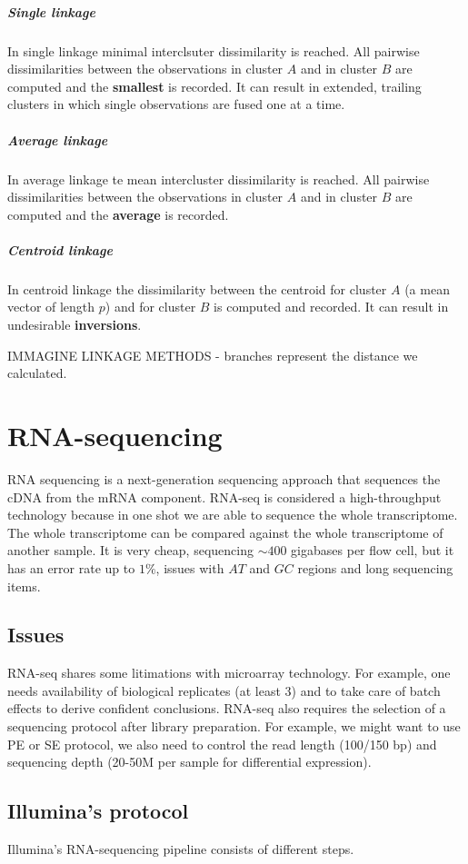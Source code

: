 				\subparagraph{Single linkage}
				In single linkage minimal interclsuter dissimilarity is reached.
				All pairwise dissimilarities between the observations in cluster $A$ and in cluster $B$ are computed and the \textbf{smallest} is recorded.
				It can result in extended, trailing clusters in which single observations are fused one at a time.

				\subparagraph{Average linkage}
				In average linkage te mean intercluster dissimilarity  is reached.
				All pairwise dissimilarities between the observations in cluster $A$ and in cluster $B$ are computed and the \textbf{average} is recorded.

				\subparagraph{Centroid linkage}
				In centroid linkage the dissimilarity between the centroid for cluster $A$ (a mean vector of length $p$) and for cluster $B$ is computed and recorded.
				It can result in undesirable \textbf{inversions}.
				
				IMMAGINE LINKAGE METHODS - branches represent the distance we calculated. 

\section{RNA-sequencing}
	RNA sequencing is a next-generation sequencing approach that sequences the cDNA from the mRNA component.
	RNA-seq is considered a high-throughput technology because in one shot we are able to sequence the whole transcriptome.
	The whole transcriptome can be compared against the whole transcriptome of another sample.
	It is very cheap, sequencing $\sim 400$ gigabases per flow cell, but it has an error rate up to $1\%$, issues with $AT$ and $GC$ regions and long sequencing items.
	
	\subsection{Issues}
	RNA-seq shares some litimations with microarray technology. 
	For example, one needs availability of biological replicates (at least $3$) and to take care of batch effects to derive confident conclusions.
	RNA-seq also requires the selection of a sequencing protocol after library preparation. For example, we might want to use PE or SE protocol, we also need to control the read length (100/150 bp) and sequencing depth (20-50M per sample for differential expression).  

	\subsection{Illumina's protocol}
	Illumina's RNA-sequencing pipeline consists of different steps.

